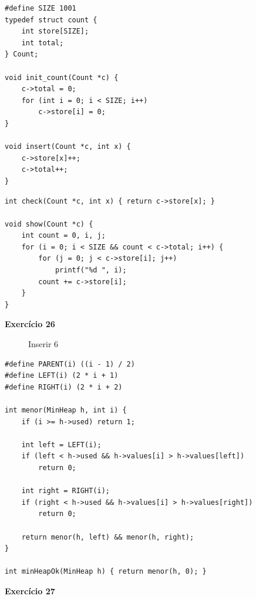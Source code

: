 \documentclass[a4paper,11pt]{article}
\begin{document}
\begin{verbatim}
#define SIZE 1001
typedef struct count {
	int store[SIZE];
	int total;
} Count;

void init_count(Count *c) {
	c->total = 0;
	for (int i = 0; i < SIZE; i++)
		c->store[i] = 0;
}

void insert(Count *c, int x) {
	c->store[x]++;
	c->total++;
}
\end{verbatim}

\begin{verbatim}
int check(Count *c, int x) { return c->store[x]; }

void show(Count *c) {
	int count = 0, i, j;
	for (i = 0; i < SIZE && count < c->total; i++) {
		for (j = 0; j < c->store[i]; j++)
			printf("%d ", i);
		count += c->store[i];
	}
}
\end{verbatim}

\noindent \textbf{Exercício 26}

\begin{figure}[H]
	\centering
	\caption{Inserir 6}
\end{figure}

\begin{verbatim}
#define PARENT(i) ((i - 1) / 2)
#define LEFT(i) (2 * i + 1)
#define RIGHT(i) (2 * i + 2)

int menor(MinHeap h, int i) {
	if (i >= h->used) return 1;
	
	int left = LEFT(i);
	if (left < h->used && h->values[i] > h->values[left])
		return 0;
	
	int right = RIGHT(i);
	if (right < h->used && h->values[i] > h->values[right])
		return 0;
	
	return menor(h, left) && menor(h, right);
}

int minHeapOk(MinHeap h) { return menor(h, 0); }
\end{verbatim}

\newpage

\noindent \textbf{Exercício 27}
\end{document}
